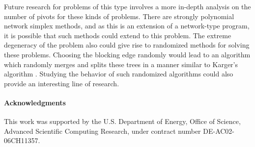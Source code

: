 \documentclass[titlepage,11pt]{article}
\begin{document}
Future research for problems of this type involves a more in-depth analysis on the number of pivots for these kinds of problems. There are strongly polynomial network simplex methods, and as this is an extension of a network-type program, it is possible that such methods could extend to this problem. The extreme degeneracy of the problem also could give rise to randomized methods for solving these problems. Choosing the blocking edge randomly would lead to an algorithm which randomly merges and splits these trees in a manner similar to Karger's algorithm \cite{karger1993global}. Studying the behavior of such randomized algorithms could also provide an interesting line of research.

\paragraph{Acknowledgments}
This work was supported by the U.S. Department of Energy, Office of Science, Advanced Scientific Computing Research, under contract number DE-AC02-06CH11357.

\printbibliography
\end{document}
